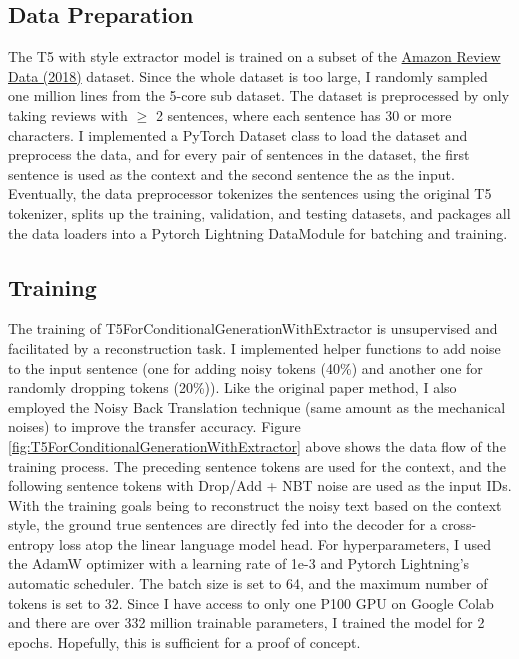 \documentclass[a4paper]{article}
\begin{document}
\subsection{Data Preparation}
The T5 with style extractor model is trained on a subset of the \href{https://nijianmo.github.io/amazon/index.html}{Amazon Review Data (2018)} dataset. Since the whole dataset is too large, I randomly sampled one million lines from the 5-core sub dataset. The dataset is preprocessed by only taking reviews with $\ge$ 2 sentences, where each sentence has 30 or more characters. I implemented a PyTorch Dataset class to load the dataset and preprocess the data, and for every pair of sentences in the dataset, the first sentence is used as the context and the second sentence the as the input. Eventually, the data preprocessor tokenizes the sentences using the original T5 tokenizer, splits up the training, validation, and testing datasets, and packages all the data loaders into a Pytorch Lightning DataModule for batching and training.

\subsection{Training}
The training of T5ForConditionalGenerationWithExtractor is unsupervised and facilitated by a reconstruction task. I implemented helper functions to add noise to the input sentence (one for adding noisy tokens (40\%) and another one for randomly dropping tokens (20\%)). Like the original paper method, I also employed the Noisy Back Translation technique (same amount as the mechanical noises) to improve the transfer accuracy. Figure \ref{fig:T5ForConditionalGenerationWithExtractor} above shows the data flow of the training process. The preceding sentence tokens are used for the context, and the following sentence tokens with Drop/Add + NBT noise are used as the input IDs. With the training goals being to reconstruct the noisy text based on the context style, the ground true sentences are directly fed into the decoder for a cross-entropy loss atop the linear language model head. For hyperparameters, I used the AdamW optimizer with a learning rate of 1e-3 and Pytorch Lightning's automatic scheduler. The batch size is set to 64, and the maximum number of tokens is set to 32. Since I have access to only one P100 GPU on Google Colab and there are over 332 million trainable parameters, I trained the model for 2 epochs. Hopefully, this is sufficient for a proof of concept.
\end{document}
